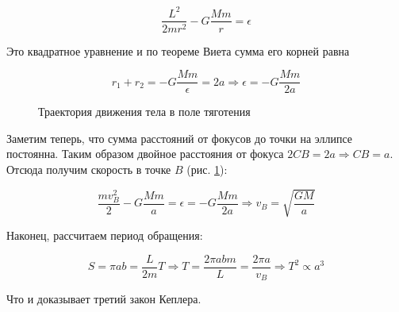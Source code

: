\begin{equation*}
    \frac{L^2}{2 m r^2} - G \frac{M m}{r} = \epsilon
\end{equation*}

\noindent
Это квадратное уравнение и по теореме Виета сумма его корней равна

\begin{equation*}
    r_1 + r_2 = - G \frac{M m}{\epsilon} = 2a \Rightarrow \epsilon = - G \frac{M m}{2 a}
\end{equation*}

\begin{figure}[htbp]
    \centering
    
    \caption{Траектория движения тела в поле тяготения}
    \label{fig:эллипс}
\end{figure}

Заметим теперь, что сумма расстояний от фокусов до точки на эллипсе постоянна. Таким образом двойное расстояния от фокуса $2 CB = 2a \Rightarrow CB = a$. Отсюда получим скорость в точке $B$ (рис. \ref{fig:эллипс}):

\begin{equation*}
    \frac{m v_B^2}{2} - G \frac{M m}{a} = \epsilon = - G \frac{M m}{2 a} \Rightarrow v_B = \sqrt{\frac{G M}{a}}
\end{equation*}

\noindent
Наконец, рассчитаем период обращения:

\begin{equation*}
    S = \pi a b = \frac{L}{2 m} T \Rightarrow T = \frac{2 \pi a b m}{L} = \frac{2 \pi a}{v_B} \Rightarrow T^2 \propto a^3
\end{equation*}

\noindent
Что и доказывает третий закон Кеплера.